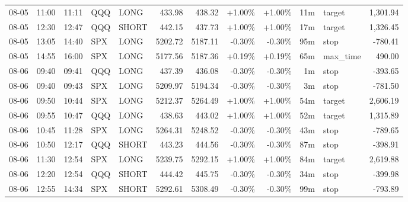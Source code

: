 \documentclass[11pt,a4paper,twoside]{article}
\begin{document}
\begin{center}
\begin{longtable}{>{\color{txtmain}}l l l l l r r r r r >{\color{txtmain}}l r}
08-05 & 11:00 & 11:11 & QQQ & LONG & 433.98 & 438.32 & \textcolor{wingreen}{+1.00\%} & \textcolor{wingreen}{+1.00\%} & 11m & target & \textcolor{wingreen}{1,301.94} \\
08-05 & 12:30 & 12:47 & QQQ & SHORT & 442.15 & 437.73 & \textcolor{wingreen}{+1.00\%} & \textcolor{wingreen}{+1.00\%} & 17m & target & \textcolor{wingreen}{1,326.45} \\
08-05 & 13:05 & 14:40 & SPX & LONG & 5202.72 & 5187.11 & \textcolor{lossred}{-0.30\%} & \textcolor{lossred}{-0.30\%} & 95m & stop & \textcolor{lossred}{-780.41} \\
08-05 & 14:55 & 16:00 & SPX & LONG & 5177.56 & 5187.36 & \textcolor{wingreen}{+0.19\%} & \textcolor{wingreen}{+0.19\%} & 65m & max\_time & \textcolor{wingreen}{490.00} \\
08-06 & 09:40 & 09:41 & QQQ & LONG & 437.39 & 436.08 & \textcolor{lossred}{-0.30\%} & \textcolor{lossred}{-0.30\%} & 1m & stop & \textcolor{lossred}{-393.65} \\
08-06 & 09:40 & 09:43 & SPX & LONG & 5209.97 & 5194.34 & \textcolor{lossred}{-0.30\%} & \textcolor{lossred}{-0.30\%} & 3m & stop & \textcolor{lossred}{-781.50} \\
08-06 & 09:50 & 10:44 & SPX & LONG & 5212.37 & 5264.49 & \textcolor{wingreen}{+1.00\%} & \textcolor{wingreen}{+1.00\%} & 54m & target & \textcolor{wingreen}{2,606.19} \\
08-06 & 09:55 & 10:47 & QQQ & LONG & 438.63 & 443.02 & \textcolor{wingreen}{+1.00\%} & \textcolor{wingreen}{+1.00\%} & 52m & target & \textcolor{wingreen}{1,315.89} \\
08-06 & 10:45 & 11:28 & SPX & LONG & 5264.31 & 5248.52 & \textcolor{lossred}{-0.30\%} & \textcolor{lossred}{-0.30\%} & 43m & stop & \textcolor{lossred}{-789.65} \\
08-06 & 10:50 & 12:17 & QQQ & SHORT & 443.23 & 444.56 & \textcolor{lossred}{-0.30\%} & \textcolor{lossred}{-0.30\%} & 87m & stop & \textcolor{lossred}{-398.91} \\
08-06 & 11:30 & 12:54 & SPX & LONG & 5239.75 & 5292.15 & \textcolor{wingreen}{+1.00\%} & \textcolor{wingreen}{+1.00\%} & 84m & target & \textcolor{wingreen}{2,619.88} \\
08-06 & 12:20 & 12:54 & QQQ & SHORT & 444.42 & 445.75 & \textcolor{lossred}{-0.30\%} & \textcolor{lossred}{-0.30\%} & 34m & stop & \textcolor{lossred}{-399.98} \\
08-06 & 12:55 & 14:34 & SPX & SHORT & 5292.61 & 5308.49 & \textcolor{lossred}{-0.30\%} & \textcolor{lossred}{-0.30\%} & 99m & stop & \textcolor{lossred}{-793.89} \\

\end{longtable}
\end{center}
\end{document}
